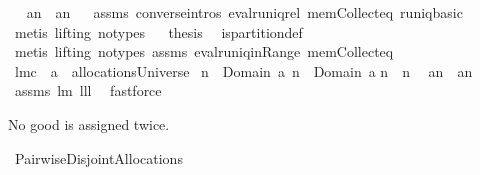 \begin{isabellebody}
\ \isamarkupfalse%
\ {\isachardoublequoteopen}a{\isacharcomma}{\isacharcomma}n{}\ {\isasymnoteq}\ a{\isacharcomma}{\isacharcomma}n{}{\isachardoublequoteclose}\ \isamarkupfalse%
\ \isanewline
assms\ converse{\isachardot}intros\ eval{\isacharunderscore}runiq{\isacharunderscore}rel\ mem{\isacharunderscore}Collect{\isacharunderscore}eq\ runiq{\isacharunderscore}basic\ \isamarkupfalse%
\ {\isacharparenleft}metis\ {\isacharparenleft}lifting{\isacharcomma}\ no{\isacharunderscore}types{\isacharparenright}{\isacharparenright}\isanewline
{}\isamarkupfalse%
\ \isamarkupfalse%
\ {\isacharquery}thesis\ \isamarkupfalse%
\ is{\isacharunderscore}partition{\isacharunderscore}def\ \isamarkupfalse%
\ {\isacharparenleft}metis\ {\isacharparenleft}lifting{\isacharcomma}\ no{\isacharunderscore}types{\isacharparenright}\ assms{\isacharparenleft}{}{\isacharparenright}\ eval{\isacharunderscore}runiq{\isacharunderscore}in{\isacharunderscore}Range\ mem{\isacharunderscore}Collect{\isacharunderscore}eq{\isacharparenright}\isanewline
{}\isamarkupfalse%
%
\endisatagproof
{\isafoldproof}%
%
\isadelimproof
%
\endisadelimproof
\isanewline
\isanewline
{}\isamarkupfalse%
\ lm{}{}c{\isacharcolon}\ \ {\isachardoublequoteopen}a\ {\isasymin}\ allocationsUniverse{\isachardoublequoteclose}\ \isanewline
{\isachardoublequoteopen}n{}\ {\isasymin}\ Domain\ a{\isachardoublequoteclose}\ {\isachardoublequoteopen}n{}\ {\isasymin}\ Domain\ a{\isachardoublequoteclose}\isanewline
{\isachardoublequoteopen}n{}\ {\isasymnoteq}\ n{}{\isachardoublequoteclose}\ \isanewline
{}\ {\isachardoublequoteopen}a{\isacharcomma}{\isacharcomma}{\isacharcomma}n{}\ {\isasyminter}\ a{\isacharcomma}{\isacharcomma}{\isacharcomma}n{}{\isacharequal}{\isacharbraceleft}{\isacharbraceright}{\isachardoublequoteclose}%
\isadelimproof
\ %
\endisadelimproof
%
\isatagproof
{}\isamarkupfalse%
\ assms\ lm{}{}\ lll{}{}\ \isamarkupfalse%
\ fastforce%
\endisatagproof
{\isafoldproof}%
%
\isadelimproof
%
\endisadelimproof
%
\begin{isamarkuptext}%
No good is assigned twice.%
\end{isamarkuptext}%
\isamarkuptrue%
\isamarkupfalse%
\ PairwiseDisjointAllocations{\isacharcolon}\isanewline

\end{isabellebody}
